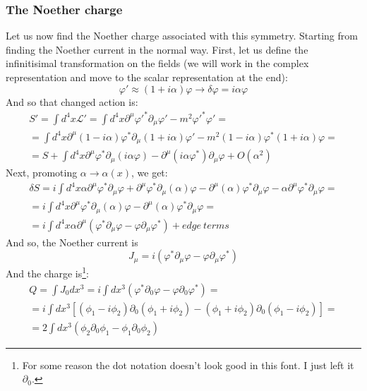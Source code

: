 \documentclass{article}
\begin{document}
\subsubsection{The Noether charge}
Let us now find the Noether charge associated with this symmetry. Starting from finding the Noether current in the normal way. First, let us define the infinitisimal transformation on the fields (we will work in the complex representation and move to the scalar representation at the end):
\begin{equation}
    \varphi' \approx (1 + i\alpha)\varphi \rightarrow \delta\varphi = i\alpha\varphi
\end{equation}
And so that changed action is:
\begin{equation}
\begin{gathered}
    S' = \int d^4x \mathcal{L}' = \int d^4x \partial^\mu\varphi'^*\partial_\mu\varphi' - m^2\varphi'^*\varphi' = \\ = \int d^4x \partial^\mu(1 - i\alpha)\varphi^*\partial_\mu(1 + i\alpha)\varphi' - m^2(1 - i\alpha)\varphi^*(1 + i\alpha)\varphi = \\ =
    S + \int d^4x \partial^\mu\varphi^*\partial_\mu(i\alpha\varphi) - \partial^\mu(i\alpha\varphi^*)\partial_\mu\varphi + O(\alpha^2)
\end{gathered}
\end{equation}
Next, promoting $\alpha \rightarrow \alpha(x)$, we get:
\begin{equation}
\begin{gathered}
    \delta S = i\int d^4x \alpha\partial^\mu\varphi^*\partial_\mu\varphi + \partial^\mu\varphi^*\partial_\mu(\alpha)\varphi - \partial^\mu(\alpha)\varphi^*\partial_\mu\varphi - \alpha\partial^\mu\varphi^*\partial_\mu\varphi = \\ =
    i\int d^4x \partial^\mu\varphi^*\partial_\mu(\alpha)\varphi - \partial^\mu(\alpha)\varphi^*\partial_\mu\varphi
    = \\ =
    i\int d^4x \alpha\partial^\mu(\varphi^*\partial_\mu\varphi - \varphi\partial_\mu\varphi^*) + edge \ terms
\end{gathered}
\end{equation}
And so, the Noether current is
\begin{equation}
    J_\mu = i(\varphi^*\partial_\mu\varphi - \varphi\partial_\mu\varphi^*)
\end{equation}
And the charge is\footnote{For some reason the dot notation doesn't look good in this font. I just left it $\partial_0$.}:
\begin{equation}
\begin{gathered}
    Q = \int J_0 dx^3 = i \int dx^3 (\varphi^*\partial_0\varphi - \varphi\partial_0\varphi^*) = \\ =
    i \int dx^3 [(\phi_1 - i\phi_2)\partial_0(\phi_1 + i\phi_2) - (\phi_1 + i\phi_2)\partial_0(\phi_1 - i\phi_2)] = \\ =
    2\int dx^3 \left(
        \phi_2\partial_0\phi_1 - \phi_1\partial_0\phi_2
    \right)
\end{gathered}
\end{equation}
\end{document}
